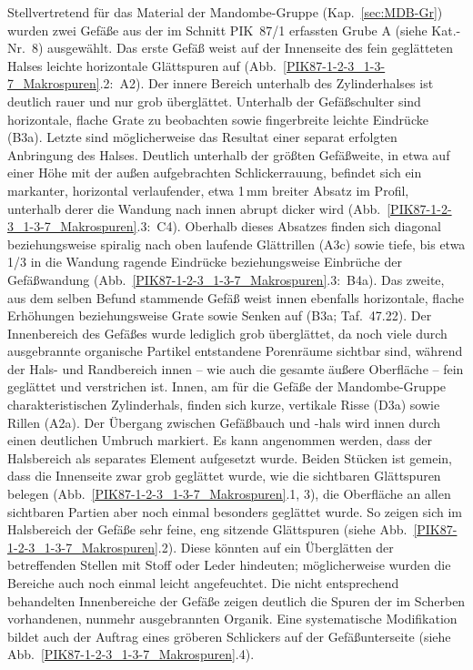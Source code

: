 Stellvertretend für das Material der Mandombe-Gruppe (Kap.~\ref{sec:MDB-Gr}) wurden zwei Gefäße aus der im Schnitt PIK~87/1 erfassten Grube A (siehe Kat.-Nr.~8) ausgewählt. Das erste Gefäß weist auf der Innenseite des fein geglätteten Halses leichte horizontale Glättspuren auf (Abb.~\ref{PIK87-1-2-3_1-3-7_Makrospuren}.2:~A2). Der innere Bereich unterhalb des Zylinderhalses ist deutlich rauer und nur grob überglättet. Unterhalb der Gefäßschulter sind horizontale, flache Grate zu beobachten sowie fingerbreite leichte Eindrücke (B3a). Letzte sind möglicherweise das Resultat einer separat erfolgten Anbringung des Halses. Deutlich unterhalb der größten Gefäßweite, in etwa auf einer Höhe mit der außen aufgebrachten Schlickerrauung, befindet sich ein markanter, horizontal verlaufender, etwa 1\,mm breiter Absatz im Profil, unterhalb derer die Wandung nach innen abrupt dicker wird (Abb.~\ref{PIK87-1-2-3_1-3-7_Makrospuren}.3:~C4). Oberhalb dieses Absatzes finden sich diagonal beziehungsweise spiralig nach oben laufende Glättrillen (A3c) sowie tiefe, bis etwa 1/3 in die Wandung ragende Eindrücke beziehungsweise Einbrüche der Gefäßwandung (Abb.~\ref{PIK87-1-2-3_1-3-7_Makrospuren}.3:~B4a). Das zweite, aus dem selben Befund stammende Gefäß weist innen ebenfalls horizontale, flache Erhöhungen beziehungsweise Grate sowie Senken auf (B3a; Taf.~47.22). Der Innenbereich des Gefäßes wurde lediglich grob überglättet, da noch viele durch ausgebrannte organische Partikel entstandene Porenräume sichtbar sind, während der Hals- und Randbereich innen -- wie auch die gesamte äußere Oberfläche -- fein geglättet und verstrichen ist. Innen, am für die Gefäße der Mandombe-Gruppe charakteristischen Zylinderhals, finden sich kurze, vertikale Risse (D3a) sowie Rillen (A2a). Der Übergang zwischen Gefäßbauch und -hals wird innen durch einen deutlichen Umbruch markiert. Es kann angenommen werden, dass der Halsbereich als separates Element aufgesetzt wurde. Beiden Stücken ist gemein, dass die Innenseite zwar grob geglättet wurde, wie die sichtbaren Glättspuren belegen (Abb.~\ref{PIK87-1-2-3_1-3-7_Makrospuren}.1, 3), die Oberfläche an allen sichtbaren Partien aber noch einmal besonders geglättet wurde. So zeigen sich im Halsbereich der Gefäße sehr feine, eng sitzende Glättspuren (siehe Abb.~\ref{PIK87-1-2-3_1-3-7_Makrospuren}.2). Diese könnten auf ein Überglätten der betreffenden Stellen mit Stoff oder Leder hindeuten; möglicherweise wurden die Bereiche auch noch einmal leicht angefeuchtet. Die nicht entsprechend behandelten Innenbereiche der Gefäße zeigen deutlich die Spuren der im Scherben vorhandenen, nunmehr ausgebrannten Organik. Eine systematische Modifikation bildet auch der Auftrag eines gröberen Schlickers auf der Gefäßunterseite (siehe Abb.~\ref{PIK87-1-2-3_1-3-7_Makrospuren}.4).


